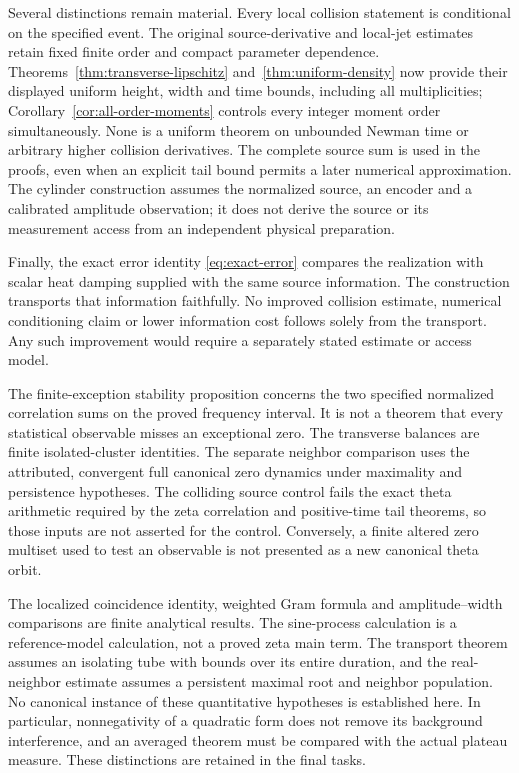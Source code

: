 Several distinctions remain material. Every local collision
statement is conditional on the specified event. The original source-derivative and local-jet estimates retain fixed finite
order and compact parameter dependence. Theorems~\ref{thm:transverse-lipschitz}
and~\ref{thm:uniform-density} now provide their displayed uniform height,
width and time bounds, including all multiplicities;
Corollary~\ref{cor:all-order-moments} controls every integer moment order
simultaneously. None is a uniform theorem on unbounded Newman time or
arbitrary higher collision derivatives. The complete source
sum is used in the proofs, even when an explicit tail bound permits
a later numerical approximation. The cylinder construction assumes
the normalized source, an encoder and a calibrated amplitude
observation; it does not derive the source or its measurement
access from an independent physical preparation.

Finally, the exact error identity \eqref{eq:exact-error} compares
the realization with scalar heat damping supplied with the same
source information. The construction transports that information
faithfully. No improved collision estimate, numerical conditioning
claim or lower information cost follows solely from the transport.
Any such improvement would require a separately stated estimate
or access model.

The finite-exception stability proposition concerns the two specified
normalized correlation sums on the proved frequency interval. It is
not a theorem that every statistical observable misses an exceptional
zero. The transverse balances are finite isolated-cluster identities.
The separate neighbor comparison uses the attributed, convergent full
canonical zero dynamics under maximality and persistence hypotheses. The colliding
source control fails the exact theta arithmetic required by the
zeta correlation and positive-time tail theorems, so those inputs
are not asserted for the control. Conversely, a finite altered zero
multiset used to test an observable is not presented as a new
canonical theta orbit.

The localized coincidence identity, weighted Gram formula and
amplitude--width comparisons are finite analytical results. The
sine-process calculation is a reference-model calculation, not a proved
zeta main term. The transport theorem assumes an isolating tube with
bounds over its entire duration, and the real-neighbor estimate assumes
a persistent maximal root and neighbor population. No canonical instance
of these quantitative hypotheses is established here. In particular,
nonnegativity of a quadratic form does not remove its background
interference, and an averaged theorem must be compared with the actual
plateau measure. These distinctions are retained in the final tasks.

